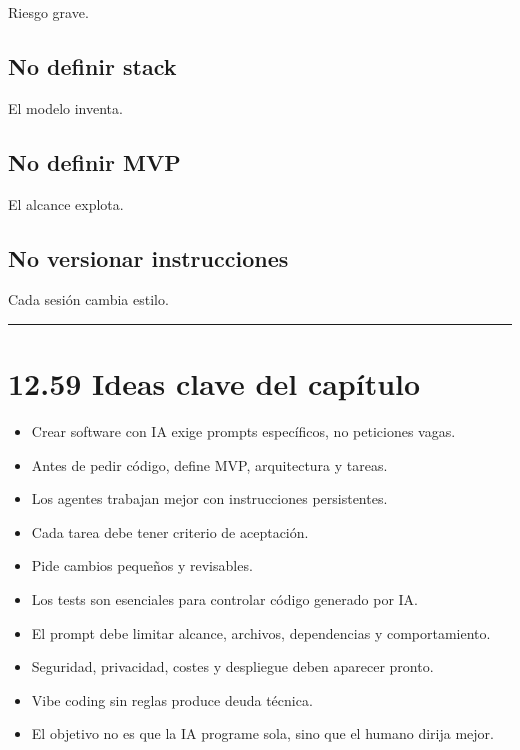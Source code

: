 Riesgo grave.

\subsection{No definir stack}\label{no-definir-stack}

El modelo inventa.

\subsection{No definir MVP}\label{no-definir-mvp}

El alcance explota.

\subsection{No versionar
instrucciones}\label{no-versionar-instrucciones}

Cada sesión cambia estilo.

\begin{center}\rule{0.5\linewidth}{0.5pt}\end{center}

\section{12.59 Ideas clave del
capítulo}\label{ideas-clave-del-capuxedtulo-11}

\begin{itemize}
\tightlist
\item
  Crear software con IA exige prompts específicos, no peticiones vagas.
\item
  Antes de pedir código, define MVP, arquitectura y tareas.
\item
  Los agentes trabajan mejor con instrucciones persistentes.
\item
  Cada tarea debe tener criterio de aceptación.
\item
  Pide cambios pequeños y revisables.
\item
  Los tests son esenciales para controlar código generado por IA.
\item
  El prompt debe limitar alcance, archivos, dependencias y
  comportamiento.
\item
  Seguridad, privacidad, costes y despliegue deben aparecer pronto.
\item
  Vibe coding sin reglas produce deuda técnica.
\item
  El objetivo no es que la IA programe sola, sino que el humano dirija
  mejor.
\end{itemize}

